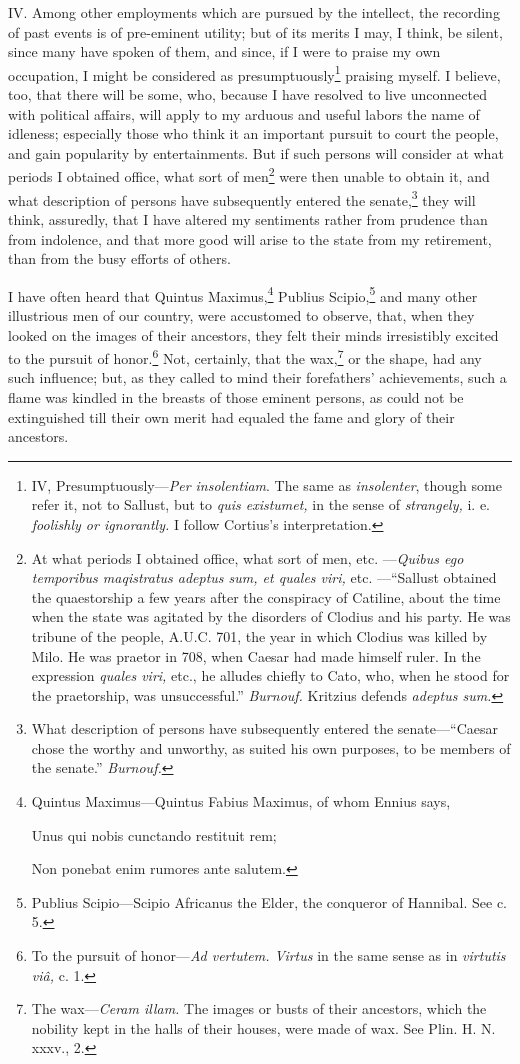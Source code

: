 IV. Among other employments which are pursued by the intellect, the
recording of past events is of pre-eminent utility; but of its merits
I may, I think, be silent, since many have spoken of them, and since,
if I were to praise my own occupation, I might be considered as
presumptuously\footnote{IV, Presumptuously—\emph{Per insolentiam}. The same as
\emph{insolenter}, though some refer it, not to Sallust, but to \emph{quis
existumet,} in the sense of \emph{strangely,} i. e. \emph{foolishly or
ignorantly.} I follow Cortius's interpretation.} praising myself. I believe, too, that there will be
some, who, because I have resolved to live unconnected with political
affairs, will apply to my arduous and useful labors the name of
idleness; especially those who think it an important pursuit to court
the people, and gain popularity by entertainments. But if such persons
will consider at what periods I obtained office, what sort of men\footnote{At what periods I obtained office, what sort of men, etc.
—\emph{Quibus ego temporibus maqistratus adeptus sum, et quales viri,} etc.
—``Sallust obtained the quaestorship a few years after the conspiracy
of Catiline, about the time when the state was agitated by the
disorders of Clodius and his party. He was tribune of the people,
A.U.C. 701, the year in which Clodius was killed by Milo. He was
praetor in 708, when Caesar had made himself ruler. In the expression
\emph{quales viri,} etc., he alludes chiefly to Cato, who, when he stood
for the praetorship, was unsuccessful.'' \emph{Burnouf.} Kritzius defends
\emph{adeptus sum.}}
were then unable to obtain it, and what description of persons have
subsequently entered the senate,\footnote{What description of persons have subsequently entered the
senate—``Caesar chose the worthy and unworthy, as suited his own
purposes, to be members of the senate.'' \emph{Burnouf.}} they will think, assuredly, that
I have altered my sentiments rather from prudence than from indolence,
and that more good will arise to the state from my retirement, than
from the busy efforts of others.

I have often heard that Quintus Maximus,\footnote{Quintus Maximus—Quintus Fabius Maximus, of whom Ennius says,

Unus qui nobis cunctando restituit rem;

Non ponebat enim rumores ante salutem.} Publius Scipio,\footnote{Publius Scipio—Scipio Africanus the Elder, the conqueror of
Hannibal. See c. 5.} and
many other illustrious men of our country, were accustomed to observe,
that, when they looked on the images of their ancestors, they felt
their minds irresistibly excited to the pursuit of honor.\footnote{To the pursuit of honor—\emph{Ad vertutem. Virtus} in the same
sense as in \emph{virtutis viâ,} c. 1.} Not,
certainly, that the wax,\footnote{The wax—\emph{Ceram illam.} The images or busts of their ancestors,
which the nobility kept in the halls of their houses, were made of wax.
See Plin. H. N. xxxv., 2.} or the shape, had any such influence;
but, as they called to mind their forefathers' achievements, such a
flame was kindled in the breasts of those eminent persons, as could
not be extinguished till their own merit had equaled the fame and
glory of their ancestors.

